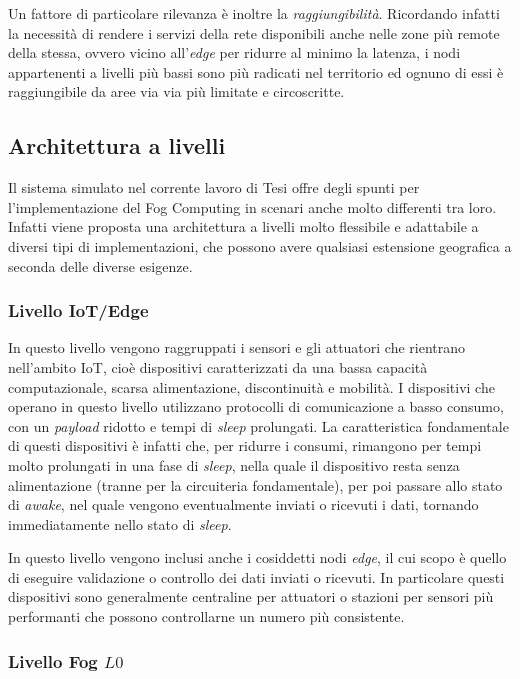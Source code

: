 Un fattore di particolare rilevanza è inoltre la \textit{raggiungibilità}. Ricordando infatti la necessità di rendere i servizi della rete disponibili anche nelle zone più remote della stessa, ovvero vicino all'\textit{edge} per ridurre al minimo la latenza, i nodi appartenenti a livelli più bassi sono più radicati nel territorio ed ognuno di essi è raggiungibile da aree via via più limitate e circoscritte. 

\subsection{Architettura a livelli}

Il sistema simulato nel corrente lavoro di Tesi offre degli spunti per l'implementazione del Fog Computing in scenari anche molto differenti tra loro. Infatti viene proposta una architettura a livelli molto flessibile e adattabile a diversi tipi di implementazioni, che possono avere qualsiasi estensione geografica a seconda delle diverse esigenze.

\subsubsection{Livello IoT/Edge}

In questo livello vengono raggruppati i sensori e gli attuatori che rientrano nell'ambito IoT, cioè dispositivi caratterizzati da una bassa capacità computazionale, scarsa alimentazione, discontinuità e mobilità. I dispositivi che operano in questo livello utilizzano protocolli di comunicazione a basso consumo, con un \textit{payload} ridotto e tempi di \textit{sleep} prolungati. La caratteristica fondamentale di questi dispositivi è infatti che, per ridurre i consumi, rimangono per tempi molto prolungati in una fase di \textit{sleep}, nella quale il dispositivo resta senza alimentazione (tranne per la circuiteria fondamentale), per poi passare allo stato di \textit{awake}, nel quale vengono eventualmente inviati o ricevuti i dati, tornando immediatamente nello stato di \textit{sleep}.

In 	questo livello vengono inclusi anche i cosiddetti nodi \textit{edge}, il cui scopo è quello di eseguire validazione o controllo dei dati inviati o ricevuti. In particolare questi dispositivi sono generalmente centraline per attuatori o stazioni per sensori più performanti che possono controllarne un numero più consistente.

\subsubsection{Livello Fog $L0$}

